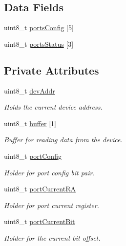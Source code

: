 \subsection*{Data Fields}
\begin{DoxyCompactItemize}
\item 
uint8\-\_\-t \hyperlink{classMAX6956_a8b915615042c5ef96fbf3a5c260d4716}{ports\-Config} \mbox{[}5\mbox{]}
\item 
uint8\-\_\-t \hyperlink{classMAX6956_ae8da9a65da74dce7eb907319b0198847}{ports\-Status} \mbox{[}3\mbox{]}
\end{DoxyCompactItemize}
\subsection*{Private Attributes}
\begin{DoxyCompactItemize}
\item 
uint8\-\_\-t \hyperlink{classMAX6956_a6ba2f8011914df50d6022ab54b27748d}{dev\-Addr}
\begin{DoxyCompactList}\small\item\em Holds the current device address. \end{DoxyCompactList}\item 
uint8\-\_\-t \hyperlink{classMAX6956_a9f4597436b10ee86a02c96c2b0605851}{buffer} \mbox{[}1\mbox{]}
\begin{DoxyCompactList}\small\item\em Buffer for reading data from the device. \end{DoxyCompactList}\item 
uint8\-\_\-t \hyperlink{classMAX6956_a9799e7684546e3e9b24506d436586a09}{port\-Config}
\begin{DoxyCompactList}\small\item\em Holder for port config bit pair. \end{DoxyCompactList}\item 
uint8\-\_\-t \hyperlink{classMAX6956_ab0d382db3afe7930d1b95311bfd90164}{port\-Current\-R\-A}
\begin{DoxyCompactList}\small\item\em Holder for port current register. \end{DoxyCompactList}\item 
uint8\-\_\-t \hyperlink{classMAX6956_ad3057b6b21ae712acb0129270da63334}{port\-Current\-Bit}
\begin{DoxyCompactList}\small\item\em Holder for the current bit offset. \end{DoxyCompactList}\item 

\end{DoxyCompactItemize}
